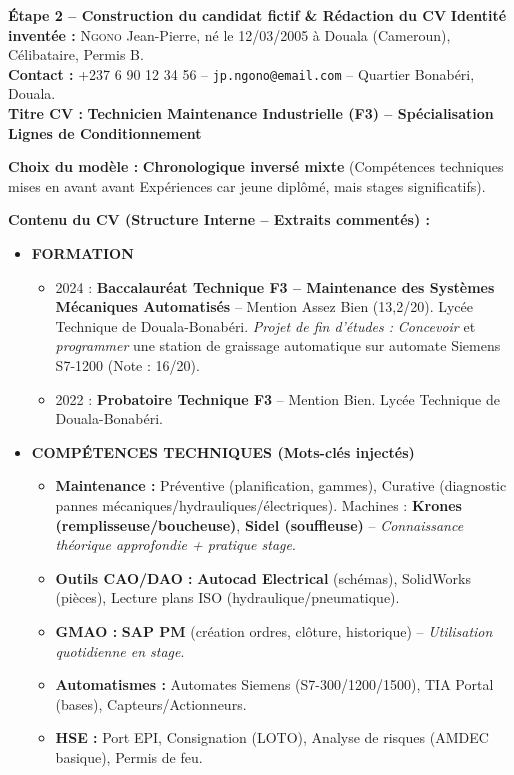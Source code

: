 \documentclass[11pt]{article}
\begin{document}
\begin{exoresolu}
\textbf{Étape 2 -- Construction du candidat fictif \& Rédaction du CV}
\noindent
\textbf{Identité inventée :} \textsc{Ngono} Jean-Pierre, né le 12/03/2005 à Douala (Cameroun), Célibataire, Permis B. \\
\textbf{Contact :} +237 6 90 12 34 56 -- \texttt{jp.ngono@email.com} -- Quartier Bonabéri, Douala. \\
\textbf{Titre CV :} \textbf{Technicien Maintenance Industrielle (F3) -- Spécialisation Lignes de Conditionnement}

\medskip
\noindent
\textbf{Choix du modèle :} \textbf{Chronologique inversé mixte} (Compétences techniques mises en avant avant Expériences car jeune diplômé, mais stages significatifs).

\medskip
\noindent
\textbf{Contenu du CV (Structure Interne -- Extraits commentés) :}

\begin{itemize}
    \item \textbf{FORMATION}
    \begin{itemize}
        \item 2024 : \textbf{Baccalauréat Technique F3 -- Maintenance des Systèmes Mécaniques Automatisés} -- Mention Assez Bien (13,2/20). Lycée Technique de Douala-Bonabéri. \emph{Projet de fin d'études :} \emph{Concevoir} et \emph{programmer} une station de graissage automatique sur automate Siemens S7-1200 (Note : 16/20).
        \item 2022 : \textbf{Probatoire Technique F3} -- Mention Bien. Lycée Technique de Douala-Bonabéri.
    \end{itemize}
    
    \item \textbf{COMPÉTENCES TECHNIQUES (Mots-clés injectés)}
    \begin{itemize}
        \item \textbf{Maintenance :} Préventive (planification, gammes), Curative (diagnostic pannes mécaniques/hydrauliques/électriques). Machines : \textbf{Krones (remplisseuse/boucheuse)}, \textbf{Sidel (souffleuse)} -- \emph{Connaissance théorique approfondie + pratique stage}.
        \item \textbf{Outils CAO/DAO :} \textbf{Autocad Electrical} (schémas), SolidWorks (pièces), Lecture plans ISO (hydraulique/pneumatique).
        \item \textbf{GMAO :} \textbf{SAP PM} (création ordres, clôture, historique) -- \emph{Utilisation quotidienne en stage}.
        \item \textbf{Automatismes :} Automates Siemens (S7-300/1200/1500), TIA Portal (bases), Capteurs/Actionneurs.
        \item \textbf{HSE :} Port EPI, Consignation (LOTO), Analyse de risques (AMDEC basique), Permis de feu.
    \end{itemize}
    

\end{itemize}
\end{exoresolu}
\end{document}
